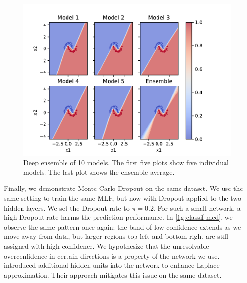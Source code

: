 \begin{figure}[tb]
  \centering
  \includegraphics{images/classif_ensemble.pdf}
  \caption{Deep ensemble of 10 models. The first five plots show five individual models. The last plot shows the ensemble average.}
  \label{fig:classif-ensemble}
\end{figure}

Finally, we demonstrate Monte Carlo Dropout on the same dataset. We use the same setting to train the same MLP, but now with Dropout applied to the two hidden layers. We set the Dropout rate to $\pi = 0.2$. For such a small network, a high Dropout rate harms the prediction performance. In \cref{fig:classif-mcd}, we observe the same pattern once again: the band of low confidence extends as we move away from data, but larger regions top left and bottom right are still assigned with high confidence. We hypothesize that the unresolvable overconfidence in certain directions is a property of the network we use. \cite{kristiadiLearnableUncertaintyLaplace2021} introduced additional hidden units into the network to enhance Laplace approximation. Their approach mitigates this issue on the same dataset.

